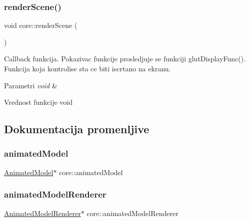 \subsubsection{\texorpdfstring{render\+Scene()}{renderScene()}}
{\footnotesize\ttfamily void core\+::render\+Scene (\begin{DoxyParamCaption}\item[{void}]{ }\end{DoxyParamCaption})}



Callback funkcija. Pokazivac funkcije prosledjuje se funkciji glut\+Display\+Func(). Funkcija koja kontrolise sta ce biti iscrtano na ekranu. 


\begin{DoxyParams}{Parametri}
{\em void} & \\
\hline
\end{DoxyParams}
\begin{DoxyReturn}{Vrednost funkcije}
void 
\end{DoxyReturn}


\subsection{Dokumentacija promenljive}
\mbox{\label{namespacecore_a32acc9ced9824face25fb6376f19427c}} 
\subsubsection{\texorpdfstring{animated\+Model}{animatedModel}}
{\footnotesize\ttfamily \hyperlink{classmodel_1_1AnimatedModel}{Animated\+Model}$\ast$ core\+::animated\+Model}

\mbox{\label{namespacecore_a8788476f2673b1425b8946203866084c}} 
\subsubsection{\texorpdfstring{animated\+Model\+Renderer}{animatedModelRenderer}}
{\footnotesize\ttfamily \hyperlink{classcore_1_1AnimatedModelRenderer}{Animated\+Model\+Renderer}$\ast$ core\+::animated\+Model\+Renderer}

